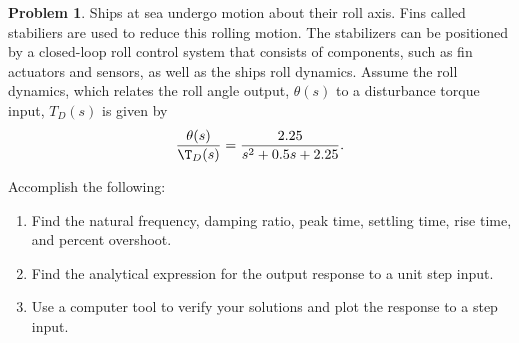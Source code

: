 \documentclass[10pt]{article}
\theoremstyle{definition}
\newtheorem{prob}{Problem}[section]
\newenvironment{subprob}%
{\renewcommand{\theenumi}{\alph{enumi}}\renewcommand{\labelenumi}{(\theenumi)}\begin{enumerate}}%
{\end{enumerate}}%
\begin{document}
\begin{prob}
    Ships at sea undergo motion about their roll axis.
    Fins called stabiliers are used to reduce this rolling motion.
    The stabilizers can be positioned by a closed-loop roll control system that consists of components, such as fin actuators and sensors, as well as the ships roll dynamics.
    Assume the roll dynamics, which relates the roll angle output, \( \theta (s) \) to a disturbance torque input, \( T_D(s)\) is given by
    \begin{align}
        \frac{\theta(s)}{\T_D(s)} = \frac{2.25}{s^2 + 0.5 s + 2.25} .
    \end{align}

    Accomplish the following:
    \begin{subprob}
        \item Find the natural frequency, damping ratio, peak time, settling time, rise time, and percent overshoot.
        \item Find the analytical expression for the output response to a unit step input.
        \item Use a computer tool to verify your solutions and plot the response to a step input.
    \end{subprob}
\end{prob}
\end{document}
